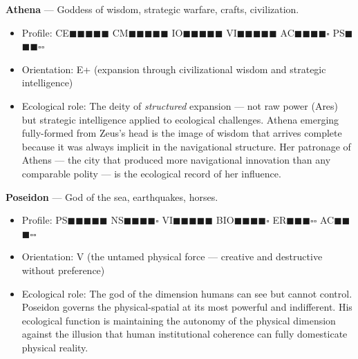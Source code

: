 \textbf{Athena} — Goddess of wisdom, strategic warfare, crafts, civilization.

\begin{itemize}[nosep,leftmargin=*]
  \item Profile: CE$\blacksquare$$\blacksquare$$\blacksquare$$\blacksquare$$\blacksquare$ CM$\blacksquare$$\blacksquare$$\blacksquare$$\blacksquare$$\blacksquare$ IO$\blacksquare$$\blacksquare$$\blacksquare$$\blacksquare$$\blacksquare$ VI$\blacksquare$$\blacksquare$$\blacksquare$$\blacksquare$$\blacksquare$ AC$\blacksquare$$\blacksquare$$\blacksquare$$\blacksquare$$\square$ PS$\blacksquare$$\blacksquare$$\blacksquare$$\square$$\square$
  \item Orientation: E+ (expansion through civilizational wisdom and strategic intelligence)
  \item Ecological role: The deity of \textit{structured} expansion — not raw power (Ares) but strategic intelligence applied to ecological challenges. Athena emerging fully-formed from Zeus's head is the image of wisdom that arrives complete because it was always implicit in the navigational structure. Her patronage of Athens — the city that produced more navigational innovation than any comparable polity — is the ecological record of her influence.
\end{itemize}


\textbf{Poseidon} — God of the sea, earthquakes, horses.

\begin{itemize}[nosep,leftmargin=*]
  \item Profile: PS$\blacksquare$$\blacksquare$$\blacksquare$$\blacksquare$$\blacksquare$ NS$\blacksquare$$\blacksquare$$\blacksquare$$\blacksquare$$\square$ VI$\blacksquare$$\blacksquare$$\blacksquare$$\blacksquare$$\blacksquare$ BIO$\blacksquare$$\blacksquare$$\blacksquare$$\blacksquare$$\square$ ER$\blacksquare$$\blacksquare$$\blacksquare$$\square$$\square$ AC$\blacksquare$$\blacksquare$$\blacksquare$$\square$$\square$
  \item Orientation: V (the untamed physical force — creative and destructive without preference)
  \item Ecological role: The god of the dimension humans can see but cannot control. Poseidon governs the physical-spatial at its most powerful and indifferent. His ecological function is maintaining the autonomy of the physical dimension against the illusion that human institutional coherence can fully domesticate physical reality.
\end{itemize}


